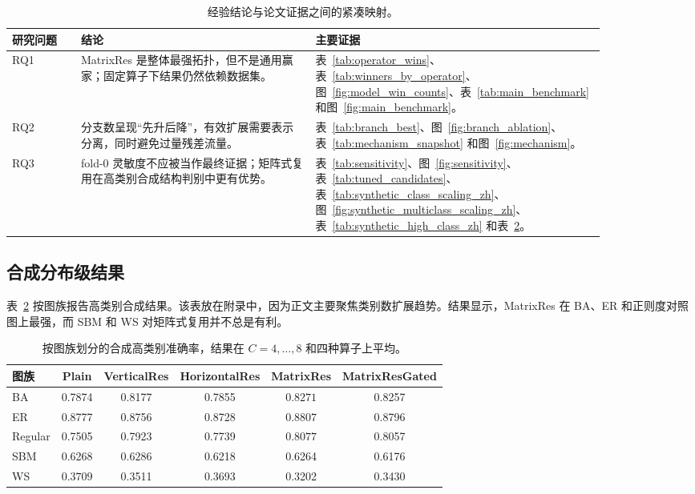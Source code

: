 \documentclass[UTF8,10pt]{ctexart}
\begin{document}
\begin{table}[h]
\centering
\small
\caption{经验结论与论文证据之间的紧凑映射。}
\label{tab:evidence_map}
\begin{tabular}{p{0.10\linewidth} p{0.34\linewidth} p{0.42\linewidth}}
\toprule
研究问题 & 结论 & 主要证据 \\
\midrule
RQ1 & MatrixRes 是整体最强拓扑，但不是通用赢家；固定算子下结果仍然依赖数据集。 & 表~\ref{tab:operator_wins}、表~\ref{tab:winners_by_operator}、图~\ref{fig:model_win_counts}、表~\ref{tab:main_benchmark} 和图~\ref{fig:main_benchmark}。 \\
RQ2 & 分支数呈现“先升后降”，有效扩展需要表示分离，同时避免过量残差流量。 & 表~\ref{tab:branch_best}、图~\ref{fig:branch_ablation}、表~\ref{tab:mechanism_snapshot} 和图~\ref{fig:mechanism}。 \\
RQ3 & fold-0 灵敏度不应被当作最终证据；矩阵式复用在高类别合成结构判别中更有优势。 & 表~\ref{tab:sensitivity}、图~\ref{fig:sensitivity}、表~\ref{tab:tuned_candidates}、表~\ref{tab:synthetic_class_scaling_zh}、图~\ref{fig:synthetic_multiclass_scaling_zh}、表~\ref{tab:synthetic_high_class_zh} 和表~\ref{tab:synthetic_distribution_high_class_zh}。 \\
\bottomrule
\end{tabular}
\end{table}

\subsection{合成分布级结果}

表~\ref{tab:synthetic_distribution_high_class_zh} 按图族报告高类别合成结果。该表放在附录中，因为正文主要聚焦类别数扩展趋势。结果显示，MatrixRes 在 BA、ER 和正则度对照图上最强，而 SBM 和 WS 对矩阵式复用并不总是有利。

\begin{table}[h]
\centering
\scriptsize
\caption{按图族划分的合成高类别准确率，结果在 \(C=4,\ldots,8\) 和四种算子上平均。}
\label{tab:synthetic_distribution_high_class_zh}
\begin{tabular}{l c c c c c}
\toprule
图族 & Plain & VerticalRes & HorizontalRes & MatrixRes & MatrixResGated \\
\midrule
BA & 0.7874 & 0.8177 & 0.7855 & \(\mathbf{0.8271}\) & 0.8257 \\
ER & 0.8777 & 0.8756 & 0.8728 & \(\mathbf{0.8807}\) & 0.8796 \\
Regular & 0.7505 & 0.7923 & 0.7739 & \(\mathbf{0.8077}\) & 0.8057 \\
SBM & 0.6268 & \(\mathbf{0.6286}\) & 0.6218 & 0.6264 & 0.6176 \\
WS & \(\mathbf{0.3709}\) & 0.3511 & 0.3693 & 0.3202 & 0.3430 \\
\bottomrule
\end{tabular}
\end{table}



\end{document}
